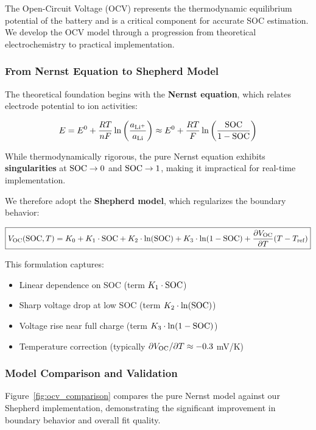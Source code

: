 The Open-Circuit Voltage (OCV) represents the thermodynamic equilibrium potential of the battery and is a critical component for accurate SOC estimation. We develop the OCV model through a progression from theoretical electrochemistry to practical implementation.

\subsubsection{From Nernst Equation to Shepherd Model}

The theoretical foundation begins with the \textbf{Nernst equation}, which relates electrode potential to ion activities:

\begin{equation}
    E = E^0 + \frac{RT}{nF} \ln\left(\frac{a_{\text{Li}^+}}{a_{\text{Li}}}\right) \approx E^0 + \frac{RT}{F} \ln\left(\frac{\text{SOC}}{1-\text{SOC}}\right)
    \label{eq:nernst}
\end{equation}

While thermodynamically rigorous, the pure Nernst equation exhibits \textbf{singularities} at $\text{SOC} \to 0$ and $\text{SOC} \to 1$, making it impractical for real-time implementation.

We therefore adopt the \textbf{Shepherd model}, which regularizes the boundary behavior:

\begin{equation}
    \boxed{V_{\text{OC}}(\text{SOC}, T) = K_0 + K_1 \cdot \text{SOC} + K_2 \cdot \ln(\text{SOC}) + K_3 \cdot \ln(1-\text{SOC}) + \frac{\partial V_{\text{OC}}}{\partial T}(T - T_{\text{ref}})}
    \label{eq:ocv}
\end{equation}

This formulation captures:
\begin{itemize}
    \item Linear dependence on SOC (term $K_1 \cdot \text{SOC}$)
    \item Sharp voltage drop at low SOC (term $K_2 \cdot \ln(\text{SOC})$)
    \item Voltage rise near full charge (term $K_3 \cdot \ln(1-\text{SOC})$)
    \item Temperature correction (typically $\partial V_{\text{OC}}/\partial T \approx -0.3$ mV/K)
\end{itemize}

\subsubsection{Model Comparison and Validation}

Figure~\ref{fig:ocv_comparison} compares the pure Nernst model against our Shepherd implementation, demonstrating the significant improvement in boundary behavior and overall fit quality.

